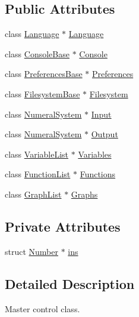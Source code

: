 \subsection*{Public Attributes}
\begin{DoxyCompactItemize}
\item 
class \hyperlink{classLanguage}{Language} $\ast$ \hyperlink{classProgram_a7c82b4c429bbee984b8bb287b9e137f7}{Language}
\item 
class \hyperlink{classConsoleBase}{Console\+Base} $\ast$ \hyperlink{classProgram_a7edba60e839230f20ce29716567bc892}{Console}
\item 
class \hyperlink{classPreferencesBase}{Preferences\+Base} $\ast$ \hyperlink{classProgram_ad6baa89972cb4938db341c77c1510793}{Preferences}
\item 
class \hyperlink{classFilesystemBase}{Filesystem\+Base} $\ast$ \hyperlink{classProgram_a54fb0dc3ee40a356fe91cea64e569b26}{Filesystem}
\item 
class \hyperlink{classNumeralSystem}{Numeral\+System} $\ast$ \hyperlink{classProgram_a6327f15962926e4f74f15e8ff56e04e5}{Input}
\item 
class \hyperlink{classNumeralSystem}{Numeral\+System} $\ast$ \hyperlink{classProgram_ac6e84e81a8bbdf99de5beea93713d8ee}{Output}
\item 
class \hyperlink{classVariableList}{Variable\+List} $\ast$ \hyperlink{classProgram_a1d4f53befb0270e64c91c24d14061188}{Variables}
\item 
class \hyperlink{classFunctionList}{Function\+List} $\ast$ \hyperlink{classProgram_ac643877adc06800a021263b2234cd236}{Functions}
\item 
class \hyperlink{classGraphList}{Graph\+List} $\ast$ \hyperlink{classProgram_a9c59323b8c560d2d418a6e6ebcde2e9d}{Graphs}
\end{DoxyCompactItemize}
\subsection*{Private Attributes}
\begin{DoxyCompactItemize}
\item 
struct \hyperlink{structNumber}{Number} $\ast$ \hyperlink{classProgram_a2e25341cb34cfdd6446deeadd0629528}{ins}
\end{DoxyCompactItemize}


\subsection{Detailed Description}
Master control class. 

